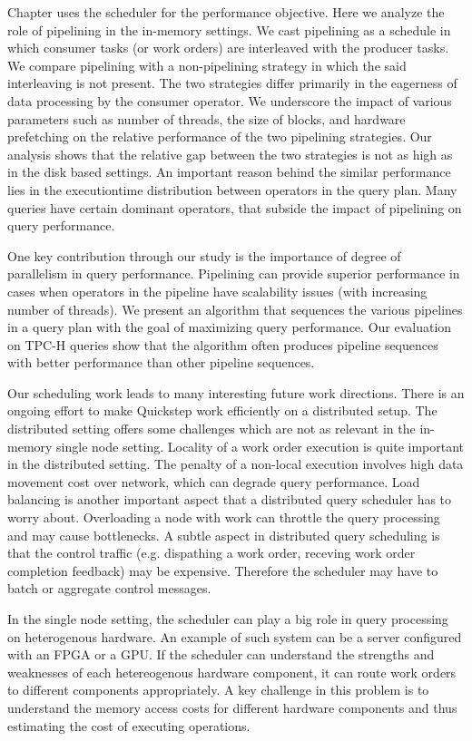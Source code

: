 Chapter uses the scheduler for the performance objective.
Here we analyze the role of pipelining in the in-memory settings. 
We cast pipelining as a schedule in which consumer tasks (or work orders) are interleaved with the producer tasks. 
We compare pipelining with a non-pipelining strategy in which the said interleaving is not present. 
The two strategies differ primarily in the eagerness of data processing by the consumer operator. 
We underscore the impact of various parameters such as number of threads, the size of blocks, and hardware prefetching on the relative performance of the two pipelining strategies. 
Our analysis shows that the relative gap between the two strategies is not as high as in the disk based settings. 
An important reason behind the similar performance lies in the executiontime distribution between operators
in the query plan.
Many queries have certain dominant operators, that subside the impact of pipelining on query performance.

One key contribution through our study is the importance of degree of parallelism in query performance. 
Pipelining can provide superior performance in cases when operators in the pipeline have scalability issues (with increasing number of threads). 
We present an algorithm that sequences the various pipelines in a query plan with the goal of maximizing query performance.  
Our evaluation on TPC-H queries show that the algorithm often produces pipeline sequences with better performance than other pipeline sequences. 

Our scheduling work leads to many interesting future work directions.
There is an ongoing effort to make Quickstep work efficiently on a distributed setup. 
The distributed setting offers some challenges which are not as relevant in the in-memory single node setting.
Locality of a work order execution is quite important in the distributed setting.
The penalty of a non-local execution involves high data movement cost over network, which can degrade query performance.
Load balancing is another important aspect that a distributed query scheduler has to worry about.
Overloading a node with work can throttle the query processing and may cause bottlenecks.
A subtle aspect in distributed query scheduling is that the control traffic (e.g. dispathing a work order, receving work order completion feedback) may be expensive.
Therefore the scheduler may have to batch or aggregate control messages.

In the single node setting, the scheduler can play a big role in query processing on heterogenous hardware.
An example of such system can be a server configured with an FPGA or a GPU.
If the scheduler can understand the strengths and weaknesses of each hetereogenous hardware component, it can route work orders to different components appropriately. 
A key challenge in this problem is to understand the memory access costs for different hardware components and thus estimating the cost of executing operations.